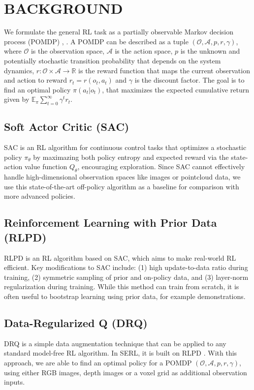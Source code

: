 \documentclass[letterpaper, 10 pt, conference]{ieeeconf}  %
\begin{document}
\section{BACKGROUND}
We formulate the general RL task as a partially observable Markov decision process (POMDP) \cite{cbf00562-4ec1-30aa-96c9-a7b516c45b2b}, \cite{KAELBLING199899}. A POMDP can be described as a tuple $(\mathcal{O}, \mathcal{A}, p, r, \gamma)$, where $\mathcal{O}$ is the observation space, $\mathcal{A}$ is the action space, $p$ is the unknown and potentially stochastic transition probability that depends on the system dynamics, $r:\mathcal{O} \times \mathcal{A} \rightarrow \mathbb{R}$ is the reward function that maps the current observation and action to reward $r_t=r(o_t,a_t)$ and $\gamma$ is the discount factor. 
The goal is to find an optimal policy $\pi(a_t|o_t)$, that maximizes the expected cumulative return given by $\mathbb{E}_\pi\sum_{t=0}^\infty\gamma^tr_t$.

\subsection{Soft Actor Critic (SAC)}
SAC \cite{haarnoja2018softactorcriticoffpolicymaximum} is an RL algorithm for continuous control tasks that optimizes a stochastic policy $\pi_{\theta}$ by maximazing both policy entropy \cite{10.5555/1620270.1620297} and expected reward via the state-action value function $Q_\theta$, encouraging exploration. Since SAC cannot effectively handle high-dimensional observation spaces like images or pointcloud data, we use this state-of-the-art off-policy algorithm as a baseline for comparison with more advanced policies.

\subsection{Reinforcement Learning with Prior Data (RLPD)}
RLPD \cite{ball2023efficientonlinereinforcementlearning} is an RL algorithm based on SAC, which aims to make real-world RL efficient. Key modifications to SAC include: (1) high update-to-data ratio during training, (2) symmetric sampling of prior and on-policy data, and (3) layer-norm regularization during training. While this method can train from scratch, it is often useful to bootstrap learning using prior data, for example demonstrations.

\subsection{Data-Regularized Q (DRQ)}
DRQ \cite{kostrikov2021imageaugmentationneedregularizing} is a simple data augmentation technique that can be applied to any standard model-free RL algorithm. In SERL, it is built on RLPD \cite{ball2023efficientonlinereinforcementlearning}. With this approach, we are able to find an optimal policy for a POMDP $(\mathcal{O}, \mathcal{A}, p, r, \gamma)$, using either RGB images, depth images or a voxel grid as additional observation inputs. 
\end{document}
